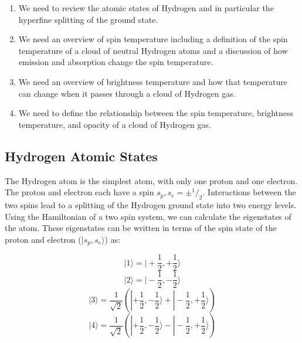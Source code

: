 \begin{enumerate}

\item We need to review the atomic states of Hydrogen and in particular the \cm hyperfine splitting of the ground state. 

\item We need an overview of spin temperature including a definition of the spin temperature of a cloud of neutral Hydrogen atoms and a discussion of how emission and absorption change the spin temperature. 

\item We need an overview of brightness temperature and how that temperature can change when it passes through a cloud of Hydrogen gas. 

\item We need to define the relationship between the spin temperature, brightness temperature, and opacity of a cloud of Hydrogen gas. 

\end{enumerate}


\subsection{Hydrogen Atomic States}

The Hydrogen atom is the simplest atom, with only one proton and one electron. The proton and electron each have a spin $s_p,s_e = \pm ^1/_2$. Interactions between the two spins lead to a splitting of the Hydrogen ground state into two energy levels. Using the Hamiltonian of a two spin system, we can calculate the eigenstates of the atom. These eigenstates can be written in terms of the spin state of the proton and electron ($| s_p, s_e \rangle$) as:

\begin{equation}
| 1 \rangle = | + \frac{1}{2} , + \frac{1}{2} \rangle 
\end{equation}
\begin{equation}
| 2 \rangle = | - \frac{1}{2}, - \frac{1}{2} \rangle 
\end{equation}
\begin{equation}
| 3 \rangle = \frac{1}{\sqrt{2}} (| + \frac{1}{2}, - \frac{1}{2} \rangle + |- \frac{1}{2}, + \frac{1}{2} \rangle) 
\end{equation}
\begin{equation}
| 4 \rangle = \frac{1}{\sqrt{2}} (| + \frac{1}{2}, - \frac{1}{2} \rangle - |- \frac{1}{2}, + \frac{1}{2} \rangle)
\end{equation}


